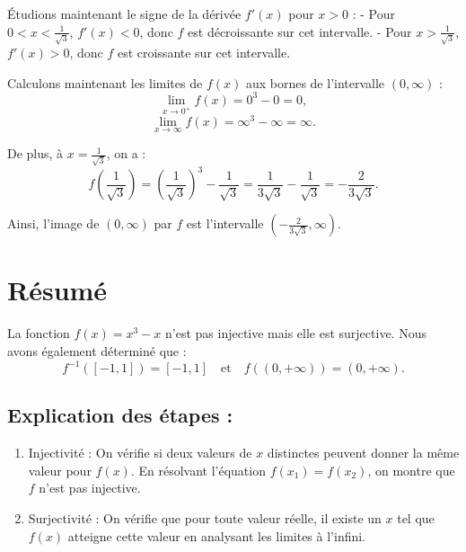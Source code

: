 \documentclass[a4paper,oneside,12pt]{amsbook}
\theoremstyle{definition}
\theoremstyle{remark}
\begin{document}
Étudions maintenant le signe de la dérivée $f'(x)$ pour $x > 0$ :
- Pour $0 < x < \frac{1}{\sqrt{3}}$, $f'(x) < 0$, donc $f$ est décroissante sur cet intervalle.
- Pour $x > \frac{1}{\sqrt{3}}$, $f'(x) > 0$, donc $f$ est croissante sur cet intervalle.

Calculons maintenant les limites de $f(x)$ aux bornes de l'intervalle $(0, \infty)$ :
\[
\lim_{x \to 0^+} f(x) = 0^3 - 0 = 0,
\]
\[
\lim_{x \to \infty} f(x) = \infty^3 - \infty = \infty.
\]

De plus, à $x = \frac{1}{\sqrt{3}}$, on a :
\[
f\left(\frac{1}{\sqrt{3}}\right) = \left(\frac{1}{\sqrt{3}}\right)^3 - \frac{1}{\sqrt{3}} = \frac{1}{3\sqrt{3}} - \frac{1}{\sqrt{3}} = -\frac{2}{3\sqrt{3}}.
\]

Ainsi, l'image de $(0, \infty)$ par $f$ est l'intervalle $(-\frac{2}{3\sqrt{3}}, \infty)$.




\section*{Résumé}

La fonction $f(x) = x^3 - x$ n'est pas injective mais elle est surjective. Nous avons également déterminé que :
\[
f^{-1}([-1, 1]) = [-1, 1] \quad \text{et} \quad f((0, +\infty)) = (0, +\infty).
\]

\subsection*{Explication des étapes :}
\begin{enumerate}
    \item Injectivité : On vérifie si deux valeurs de $x$ distinctes peuvent donner la même valeur pour $f(x)$. En résolvant l’équation $f(x_1) = f(x_2)$, on montre que $f$ n’est pas injective.
    \item Surjectivité : On vérifie que pour toute valeur réelle, il existe un $x$ tel que $f(x)$ atteigne cette valeur en analysant les limites à l’infini.
\end{enumerate}
\end{document}
